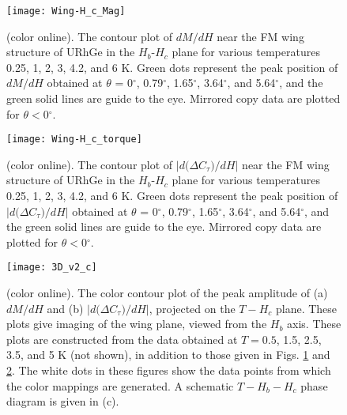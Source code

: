 \documentclass[twocolumn, aps, superscriptaddress, amsfonts,floatfix]{revtex4}%
\begin{document}
{%
\begin{figure}[t]
\begin{center}
\texttt{[image: Wing-H\_c\_Mag]}
\caption{ 
(color online). The contour plot of $dM/dH$ near the FM wing structure of  URhGe in the $H_b$-$H_c$ plane for various temperatures 0.25, 1, 2, 3, 4.2, and 6 K. Green dots represent the peak position of $dM/dH$ obtained at $\theta$ = 0$^\circ$, 0.79$^\circ$, 1.65$^\circ$, 3.64$^\circ$, and 5.64$^\circ$, and the green solid lines are guide to the eye. Mirrored copy data are plotted for $\theta<0$$^\circ$.
\label{Wing-H_c_Mag}}
\end{center}
\end{figure}
\begin{figure}[t]
\begin{center}
\texttt{[image: Wing-H\_c\_torque]}
\caption{ 
(color online). The contour plot of $|d(\Delta$$C_{\tau})$$/dH|$ near the FM wing structure of URhGe in the $H_b$-$H_c$ plane for various temperatures 0.25, 1, 2, 3, 4.2, and 6 K. Green dots represent the peak position of $|d(\Delta$$C_{\tau})$$/dH|$ obtained at $\theta$ = 0$^\circ$, 0.79$^\circ$, 1.65$^\circ$, 3.64$^\circ$, and 5.64$^\circ$, and the green solid lines are guide to the eye. Mirrored copy data are plotted for $\theta<0$$^\circ$.
\label{Wing-H_c_torque}}
\end{center}
\end{figure}
\begin{figure}[t]
\begin{center}
\texttt{[image: 3D\_v2\_c]}
\caption{ 
(color online). The color contour plot of the peak amplitude of (a) $dM/dH$ and (b) $|d(\Delta$$C_{\tau})$$/dH|$, projected on the $T-H_c$ plane. These plots  give imaging of the wing plane, viewed from the $H_b$ axis.   These plots are constructed from the data obtained at $T = 0.5$, 1.5, 2.5, 3.5, and 5 K (not shown), in addition to those given in Figs. \ref{Wing-H_c_Mag} and \ref{Wing-H_c_torque}.  The white dots in these figures show the data points from which the color mappings are generated.  A schematic $T-H_b-H_c$ phase diagram is given in (c).
\label{3D_v2_c}}
\end{center}
\end{figure}


}
\end{document}
